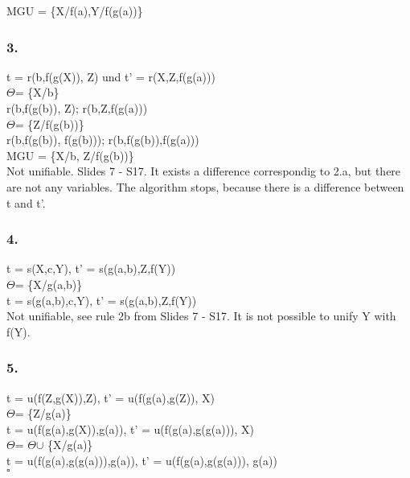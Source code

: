 \documentclass[10pt, a4paper]{article}
\newcommand{\letTheta}{$\Theta$}
\begin{document}
MGU = \{X/f(a),Y/f(g(a))\}




\subsubsection{3.}
t = r(b,f(g(X)), Z) und t' = r(X,Z,f(g(a))) \\

\letTheta = \{X/b\} \\
r(b,f(g(b)), Z); r(b,Z,f(g(a))) \\

\letTheta = \{Z/f(g(b))\} \\
r(b,f(g(b)), f(g(b))); r(b,f(g(b)),f(g(a))) \\

MGU = \{X/b, Z/f(g(b))\} \\


Not unifiable. Slides 7 - S17.
It exists a difference correspondig to 2.a, but there are not any variables. 
The algorithm stops, because there is a difference between t and t'.


\subsubsection{4.}

t = s(X,c,Y), t' = s(g(a,b),Z,f(Y))\\

\letTheta = \{X/g(a,b)\} \\
t = s(g(a,b),c,Y), t' = s(g(a,b),Z,f(Y)) \\


Not unifiable, see rule 2b from Slides 7 - S17.
It is not possible to unify Y with f(Y).


\subsubsection{5.}

t = u(f(Z,g(X)),Z), t' = u(f(g(a),g(Z)), X) \\

\letTheta = \{Z/g(a)\} \\
t = u(f(g(a),g(X)),g(a)), t' = u(f(g(a),g(g(a))), X)\\

\letTheta = \letTheta $\cup$ \{X/g(a)\} \\
t = u(f(g(a),g(g(a))),g(a)), t' = u(f(g(a),g(g(a))), g(a)) \\
$\square$ \\
\end{document}
